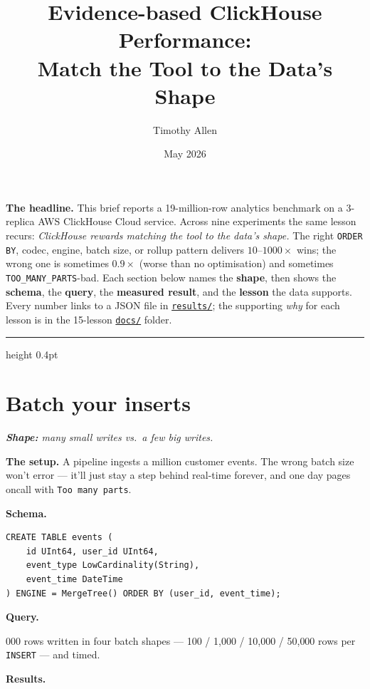 \documentclass[11pt]{article}
\title{\Large\bfseries Evidence-based ClickHouse Performance:\\
  Match the Tool to the Data's Shape}
\author{Timothy Allen}
\date{May 2026}
\newcommand{\shape}[1]{%
  \par\noindent\textit{\textbf{Shape:} #1}\par\smallskip}
\newcommand{\schemaHd}{%
  \par\smallskip\noindent\textbf{\color{accentblue}Schema.}\par\nopagebreak\smallskip}
\newcommand{\queryHd}{%
  \par\smallskip\noindent\textbf{\color{accentblue}Query.}\par\nopagebreak\smallskip}
\newcommand{\resultsHd}{%
  \par\smallskip\noindent\textbf{\color{accentblue}Results.}\par\nopagebreak\smallskip}
\begin{document}
\maketitle
\thispagestyle{empty}
\vspace{-1.2em}

\noindent
\textbf{\color{accentblue}The headline.}
This brief reports a 19-million-row analytics benchmark on a
3-replica AWS ClickHouse Cloud service. Across nine experiments the
same lesson recurs: \emph{ClickHouse rewards matching the tool to the data's
shape.} The right \texttt{ORDER BY}, codec, engine, batch size, or
rollup pattern delivers $10$--$1000\times$ wins; the wrong one is
sometimes $0.9\times$ (worse than no optimisation) and sometimes
\texttt{TOO\_MANY\_PARTS}-bad. Each section below names the
\textbf{shape}, then shows the \textbf{schema}, the \textbf{query},
the \textbf{measured result}, and the \textbf{lesson} the data
supports. Every number links to a JSON file in
\href{run:results/}{\texttt{results/}};
the supporting \emph{why} for each lesson is in the 15-lesson
\href{run:docs/}{\texttt{docs/}} folder.

\medskip
\hrule height 0.4pt
\medskip

\section{Batch your inserts}

\shape{many small writes vs.\ a few big writes.}

\textbf{The setup.} A pipeline ingests a million customer events.
The wrong batch size won't error — it'll just stay a step behind real-time
forever, and one day pages oncall with \texttt{Too many parts}.

\schemaHd
\begin{lstlisting}
CREATE TABLE events (
    id UInt64, user_id UInt64,
    event_type LowCardinality(String),
    event_time DateTime
) ENGINE = MergeTree() ORDER BY (user_id, event_time);
\end{lstlisting}

\queryHd
50{,}000 rows written in four batch shapes — 100 / 1{,}000 / 10{,}000 /
50{,}000 rows per \texttt{INSERT} — and timed.

\resultsHd
\end{document}
